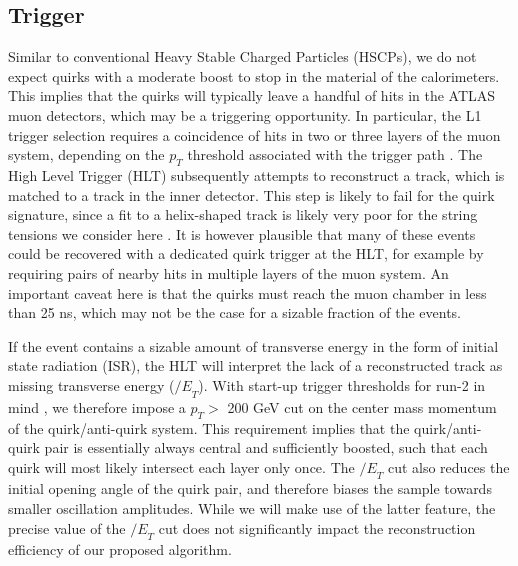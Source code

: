 \documentclass[10pt,aps,prd,nofootinbib,superscriptaddress,twocolumn,preprintnumbers,balancelastpage]{revtex4}
\newcommand{\MET}{{\slash\!\!\!\!E}_{T}}
\newcommand{\SK}[1]{\textcolor{ForestGreen}{ SK: #1}}
\newcommand{\TL}[1]{\textcolor{Purple}{\bf TL: #1}}
\begin{document}




\subsection{Trigger\label{sec:trigger}}
Similar to conventional Heavy Stable Charged Particles (HSCPs), we do not expect quirks with a moderate boost to stop in the material of the calorimeters. This implies that the quirks will typically leave a handful of hits in the ATLAS muon detectors, which may be a triggering opportunity. In particular, the L1 trigger selection requires a coincidence of hits in two or three layers of the muon system, depending on the $p_T$ threshold associated with the trigger path \cite{Aad:2014sca,ATL-DAQ-PUB-2016-001}. The High Level Trigger (HLT) subsequently attempts to reconstruct a track, which is matched to a track in the inner detector. This step is likely to fail for the quirk signature, since a fit to a helix-shaped track is likely very poor for the string tensions we consider here \cite{Farina:2017cts}.  It is however plausible that many of these events could be recovered with a dedicated quirk trigger at the HLT, for example by requiring pairs of nearby hits in multiple layers of the muon system. An important caveat here is that the quirks must reach the muon chamber in less than 25 ns, which may not be the case for a sizable fraction of the events.

If the event contains a sizable amount of transverse energy in the form of initial state radiation (ISR), the HLT will interpret the lack of a reconstructed track as missing transverse energy ($\MET$). With start-up trigger thresholds for run-2 in mind \cite{ATL-DAQ-PUB-2016-001}, we therefore impose a $p_T>$ 200 GeV cut on the center mass momentum of the quirk/anti-quirk system. This requirement implies that the quirk/anti-quirk pair is essentially always central and sufficiently boosted, such that each quirk will most likely intersect each layer only once. The $\MET$ cut also reduces the initial opening angle of the quirk pair, and therefore biases the sample towards smaller oscillation amplitudes. While we will make use of the latter feature, the precise value of the $\MET$ cut does not significantly impact the reconstruction efficiency of our proposed algorithm.
\end{document}
